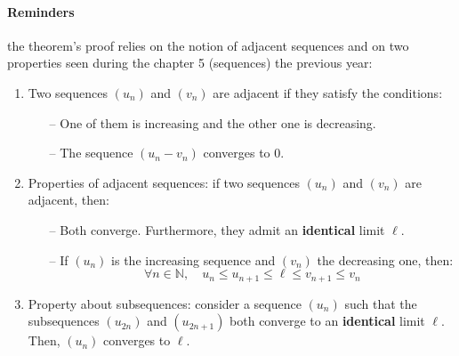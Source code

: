 \documentclass[notitlepage]{math}
\begin{document}
\paragraph{Reminders}
the theorem's proof relies on the notion of adjacent sequences and on two properties seen during the chapter 5 (sequences) the previous year:
\begin{enumerate}
    \item Two sequences $(u_n)$ and $(v_n)$ are adjacent if they satisfy the conditions:
    \begin{itemize}
        \item[--] One of them is increasing and the other one is decreasing.
        \item[--] The sequence $(u_n - v_n)$ converges to $0$.
    \end{itemize}
    \item Properties of adjacent sequences: if two sequences $(u_n)$ and $(v_n)$ are adjacent, then:
    \begin{itemize}
        \item[--] Both converge. Furthermore, they admit an \textbf{identical} limit $\ell$.
        \item[--] If $(u_n)$ is the increasing sequence and $(v_n)$ the decreasing one, then:
        \[ \forall n \in \mathbb{N}, \quad u_n \leq u_{n+1} \leq \ell \leq v_{n+1} \leq v_n \]
    \end{itemize}
    \item Property about subsequences: consider a sequence $(u_n)$ such that the subsequences $(u_{2n})$ and $(u_{2n+1})$ both converge to an \textbf{identical} limit $\ell$. Then, $(u_n)$ converges to $\ell$.
\end{enumerate}
\end{document}
